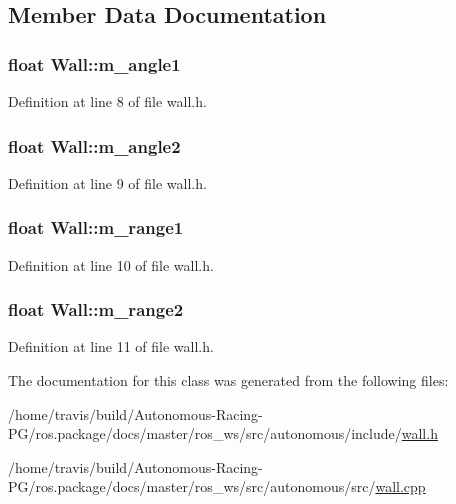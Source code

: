\subsection{Member Data Documentation}
\subsubsection[{\texorpdfstring{m\+\_\+angle1}{m_angle1}}]{\setlength{\rightskip}{0pt plus 5cm}float Wall\+::m\+\_\+angle1}\hypertarget{class_wall_aa55464f62abb57889a95936563a20671}{}\label{class_wall_aa55464f62abb57889a95936563a20671}


Definition at line 8 of file wall.\+h.

\subsubsection[{\texorpdfstring{m\+\_\+angle2}{m_angle2}}]{\setlength{\rightskip}{0pt plus 5cm}float Wall\+::m\+\_\+angle2}\hypertarget{class_wall_a1acb9bc37500a68c08db14c3659c3cd0}{}\label{class_wall_a1acb9bc37500a68c08db14c3659c3cd0}


Definition at line 9 of file wall.\+h.

\subsubsection[{\texorpdfstring{m\+\_\+range1}{m_range1}}]{\setlength{\rightskip}{0pt plus 5cm}float Wall\+::m\+\_\+range1}\hypertarget{class_wall_a56b11c6748405e939de7cf4f9fabdc2d}{}\label{class_wall_a56b11c6748405e939de7cf4f9fabdc2d}


Definition at line 10 of file wall.\+h.

\subsubsection[{\texorpdfstring{m\+\_\+range2}{m_range2}}]{\setlength{\rightskip}{0pt plus 5cm}float Wall\+::m\+\_\+range2}\hypertarget{class_wall_aeb7c600e6e41792c60498ca310c833f1}{}\label{class_wall_aeb7c600e6e41792c60498ca310c833f1}


Definition at line 11 of file wall.\+h.



The documentation for this class was generated from the following files\+:\begin{DoxyCompactItemize}
\item 
/home/travis/build/\+Autonomous-\/\+Racing-\/\+P\+G/ros.\+package/docs/master/ros\+\_\+ws/src/autonomous/include/\hyperlink{wall_8h}{wall.\+h}\item 
/home/travis/build/\+Autonomous-\/\+Racing-\/\+P\+G/ros.\+package/docs/master/ros\+\_\+ws/src/autonomous/src/\hyperlink{wall_8cpp}{wall.\+cpp}\end{DoxyCompactItemize}
